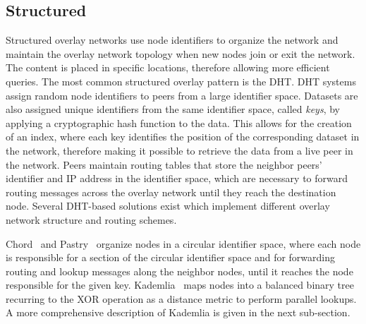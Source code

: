 \subsection{Structured} Structured overlay networks use node identifiers to organize the network and maintain the overlay network topology when new nodes join or exit the network.
The content is placed in specific locations, therefore allowing more efficient queries.
The most common structured overlay pattern is the \acl{DHT}.
\ac{DHT} systems assign random node identifiers to peers from a large identifier space.
Datasets are also assigned unique identifiers from the same identifier space, called \textit{keys}, by applying a cryptographic hash function to the data.
This allows for the creation of an index, where each key identifies the position of the corresponding dataset in the network, therefore making it possible to retrieve the data from a live peer in the network.
Peers maintain routing tables that store the neighbor peers' identifier and IP address in the identifier space, which are necessary to forward routing messages across the overlay network until they reach the destination node.
Several DHT-based solutions exist which implement different overlay network structure and routing schemes.

Chord~\cite{Stoica2001} and Pastry~\cite{Rowstron2001} organize nodes in a circular identifier space, where each node is responsible for a section of the circular identifier space and for forwarding routing and lookup messages along the neighbor nodes, until it reaches the node responsible for the given key.
Kademlia~\cite{Maymounkov2002} maps nodes into a balanced binary tree recurring to the XOR operation as a distance metric to perform parallel lookups. A more comprehensive description of Kademlia is given in the next sub-section.

